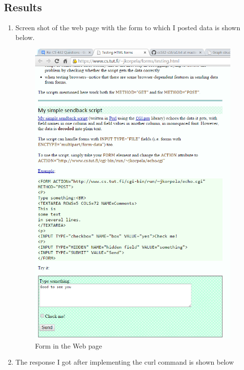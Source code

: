 \subsection{Results}
\begin{enumerate}
 	\item Screen shot of the web page with the form to which I posted data is shown below.
\begin{figure}[ht]    
    \begin{center}
        \includegraphics[scale=0.60]{Form_in_webpage.png}
        \caption{Form in the Web page}
        \label{fig:X-distribution}
    \end{center}
\end{figure}
\newpage
	\item The response I got after implementing the curl command is shown below


\end{enumerate}
